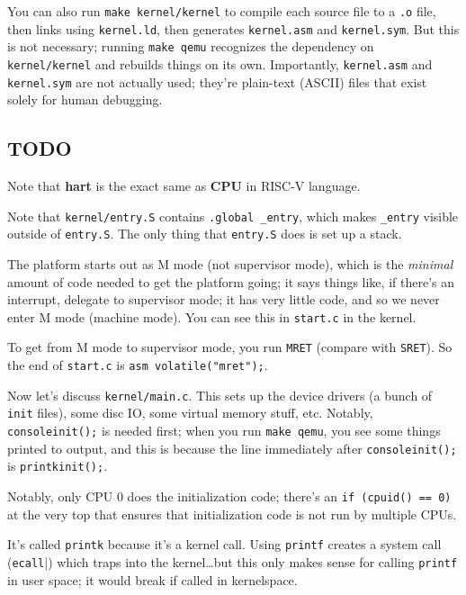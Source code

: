 You can also run \verb|make kernel/kernel|
to compile each source file to a \verb|.o| file,
then links using \verb|kernel.ld|,
then generates \verb|kernel.asm| and \verb|kernel.sym|.
But this is not necessary;
running \verb|make qemu| recognizes the dependency on \verb|kernel/kernel|
and rebuilds things on its own.
Importantly, \verb|kernel.asm| and \verb|kernel.sym|
are not actually used; they're plain-text (ASCII) files
that exist solely for human debugging.

\subsection{TODO}

Note that \textbf{hart} is the exact same as \textbf{CPU} in RISC-V language.

Note that \verb|kernel/entry.S| contains \verb|.global _entry|,
which makes \verb|_entry| visible outside of \verb|entry.S|.
The only thing that \verb|entry.S| does is set up a stack.

The platform starts out as M mode (not supervisor mode),
which is the \emph{minimal} amount of code needed to get the platform going;
it says things like, if there's an interrupt, delegate to supervisor mode;
it has very little code, and so we never enter M mode (machine mode).
You can see this in \verb|start.c| in the kernel.

To get from M mode to supervisor mode, you run \verb|MRET|
(compare with \verb|SRET|).
So the end of \verb|start.c| is
\verb|asm volatile("mret");|.

Now let's discuss \verb|kernel/main.c|.
This sets up the device drivers (a bunch of \verb|init| files),
some disc IO, some virtual memory stuff, etc.
Notably, \verb|consoleinit();| is needed first;
when you run \verb|make qemu|, you see some things printed to output,
and this is because the line immediately after \verb|consoleinit();|
is \verb|printkinit();|.

Notably, only CPU 0 does the initialization code;
there's an \verb|if (cpuid() == 0)| at the very top
that ensures that initialization code is not run by multiple CPUs.

\begin{remark}
    It's called \verb|printk| because it's a kernel call.
    Using \verb|printf| creates a system call (\verb|ecall||)
    which traps into the kernel\dots but this only makes sense
    for calling \verb|printf| in user space;
    it would break if called in kernelspace.
\end{remark}

